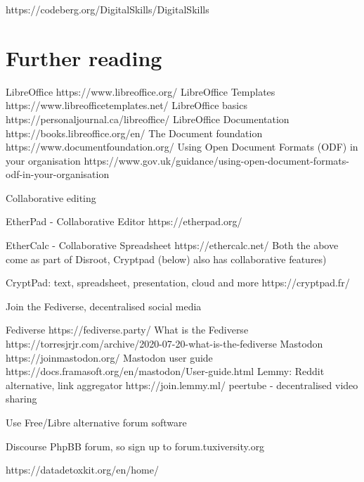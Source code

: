 https://codeberg.org/DigitalSkills/DigitalSkills

\section{Further reading}






    LibreOffice https://www.libreoffice.org/
        LibreOffice Templates https://www.libreofficetemplates.net/
        LibreOffice basics https://personaljournal.ca/libreoffice/
        LibreOffice Documentation https://books.libreoffice.org/en/
    The Document foundation https://www.documentfoundation.org/
    Using Open Document Formats (ODF) in your organisation https://www.gov.uk/guidance/using-open-document-formats-odf-in-your-organisation


Collaborative editing

    EtherPad - Collaborative Editor https://etherpad.org/

    EtherCalc - Collaborative Spreadsheet https://ethercalc.net/
        Both the above come as part of Disroot, Cryptpad (below) also has collaborative features)

    CryptPad: text, spreadsheet, presentation, cloud and more https://cryptpad.fr/
    
    


Join the Fediverse, decentralised social media

    Fediverse https://fediverse.party/
    What is the Fediverse https://torresjrjr.com/archive/2020-07-20-what-is-the-fediverse
    Mastodon https://joinmastodon.org/
    Mastodon user guide https://docs.framasoft.org/en/mastodon/User-guide.html
    Lemmy: Reddit alternative, link aggregator https://join.lemmy.ml/
peertube - decentralised video sharing

        
        

Use Free/Libre alternative forum software

    Discourse
	PhpBB forum,  so sign up to forum.tuxiversity.org 


        

https://datadetoxkit.org/en/home/


  

